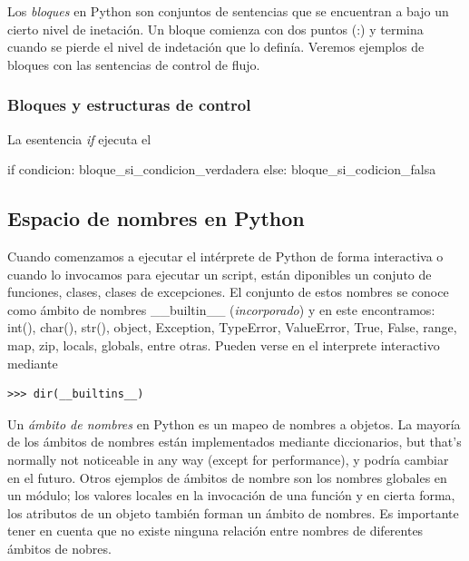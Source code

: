 \documentclass[a4paper]{report}
\begin{document}
Los \emph{bloques} en Python son conjuntos de sentencias que se encuentran a 
bajo un cierto nivel de inetación. Un bloque comienza con dos puntos (:)
y termina cuando se pierde el nivel de indetación que lo definía. Veremos
ejemplos de bloques con las sentencias de control de flujo.

\subsubsection*{Bloques y estructuras de control}
La esentencia \emph{if} ejecuta el 
\begin{python}
if condicion:
    bloque_si_condicion_verdadera
else:
    bloque_si_codicion_falsa
\end{python}





\subsection{Espacio de nombres en Python}
Cuando comenzamos a ejecutar el intérprete de Python de forma interactiva o cuando
lo invocamos para ejecutar un script, están diponibles un conjuto de funciones, clases,
clases de excepciones. El conjunto de estos nombres se conoce como ámbito de nombres 
\_\_builtin\_\_ (\emph{incorporado}) y en este encontramos: int(), char(), str(), object, 
Exception, TypeError, ValueError, True, False, range, map, zip, locals, globals, entre otras.
Pueden verse en el interprete interactivo mediante
\begin{verbatim}
>>> dir(__builtins__)
\end{verbatim}



Un \emph{ámbito de nombres} en Python es un mapeo de nombres a objetos. La mayoría de 
los ámbitos de nombres están implementados mediante diccionarios, but that's normally not noticeable in any
way (except for performance), y podría cambiar en el futuro. Otros ejemplos de ámbitos de nombre
son los nombres globales en un módulo; los valores locales en la invocación de una función y en cierta forma, 
los atributos de un objeto también forman un ámbito de nombres.
Es importante tener en cuenta que no existe ninguna relación entre nombres de diferentes ámbitos de nobres. 
\end{document}
